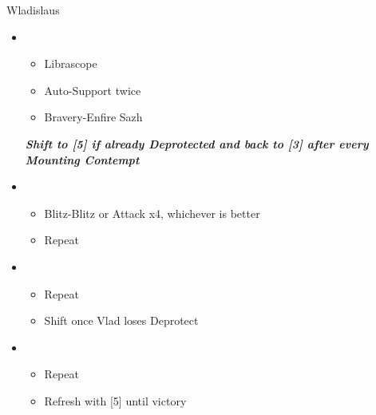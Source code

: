 \begin{battle}{Wladislaus}
	\begin{itemize}
		\item \fourth
			\begin{itemize}
				\item Librascope
				\item Auto-Support twice
				\item Bravery-Enfire Sazh
			\end{itemize}
		\textit{\textbf{Shift to [5] if already Deprotected and back to [3] after every Mounting Contempt}}
		\item \third
			\begin{itemize}
				\item Blitz-Blitz or Attack x4, whichever is better
				\item Repeat			
			\end{itemize}
		\item \fifth
			\begin{itemize}
				\item Repeat
				\item Shift once Vlad loses Deprotect
			\end{itemize}
		\item \third
			\begin{itemize}
				\item Repeat
				\item Refresh with [5] until victory
			\end{itemize}
	\end{itemize}
\end{battle}

